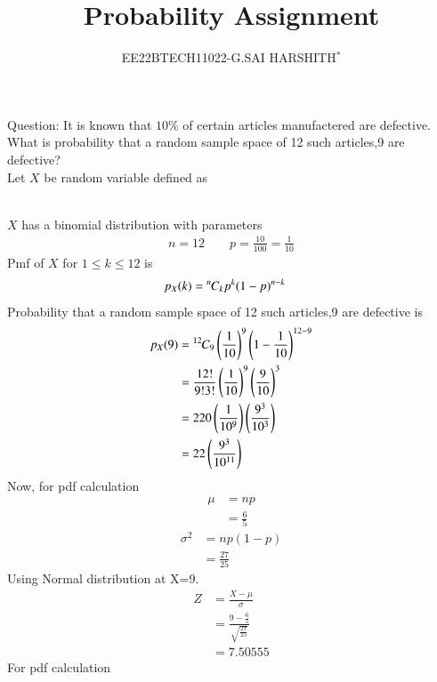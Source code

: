 \documentclass[journal,12pt,twocolumn]{IEEEtran}
\theoremstyle{remark}
\begin{document}

\vspace{3cm}

\title{Probability Assignment}
\author{EE22BTECH11022-G.SAI HARSHITH$^{*}$%
}
\maketitle
\newpage
\bigskip
\renewcommand{\thefigure}{\theenumi}
\renewcommand{\thetable}{\theenumi}

Question: It is known that $10\%$ of certain articles manufactered are defective. What is probability that a random sample space of 12 such articles,9 are defective?\\
\solution
Let $X$ be random variable defined as
\begin{table}[!ht]
	
\end{table}\\
$X$ has a binomial distribution with parameters
\begin{align}
n=12 \qquad p=\frac{10}{100}=\frac{1}{10}
\end{align}
Pmf of $X$ for $1 \leq k \leq 12$ is
\begin{align}
p_X(k)&={{}^{n}\mkern-1muC_{k}}p^k(1-p)^{n-k}
\end{align}
Probability that a random sample space of 12 such articles,9 are defective is
\begin{align}
p_X(9)&={{}^{12}\mkern-1muC_{9}}\left(\frac{1}{10}\right)^9\left(1-\frac{1}{10}\right)^{12-9}\\
&=\frac{12!}{9!3!}\left(\frac{1}{10}\right)^9\left(\frac{9}{10}\right)^{3}\\
&=220\left(\frac{1}{10^9}\right)\left(\frac{9^3}{10^3}\right)\\
&=22\left(\frac{9^3}{10^{11}}\right)
\end{align}
Now, for pdf calculation
\begin{align}
\mu&=np\\
&=\frac{6}{5}
\end{align}
\begin{align}
\sigma^2&=np(1-p)\\
&=\frac{27}{25}
\end{align}
Using Normal distribution at X=9.
\begin{align}
Z&=\frac{X-\mu}{\sigma}\\
&=\frac{9-\frac{6}{5}}{\sqrt{\frac{27}{25}}}\\
&=7.50555
\end{align}
For pdf calculation
\end{document}
